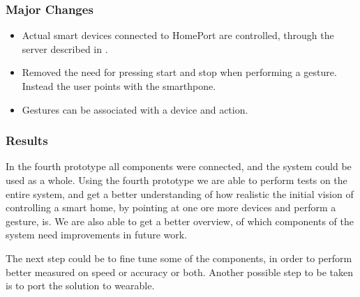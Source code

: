 \subsubsection{Major Changes}

\begin{itemize}
\item Actual smart devices connected to HomePort are controlled, through the server described in .
\item Removed the need for pressing start and stop when performing a gesture. Instead the user points with the smarthpone.
\item Gestures can be associated with a device and action.
\end{itemize}

\subsubsection{Results}

In the fourth prototype all components were connected, 
and the system could be used as a whole. 
Using the fourth prototype we are able to perform tests on the entire system, 
and get a better understanding of how realistic the initial vision of controlling a smart home, 
by pointing at one ore more devices and perform a gesture, is. 
We are also able to get a better overview, 
of which components of the system need improvements in future work.

The next step could be to fine tune some of the components, 
in order to perform better measured on speed or accuracy or both. 
Another possible step to be taken is to port the solution to wearable.

